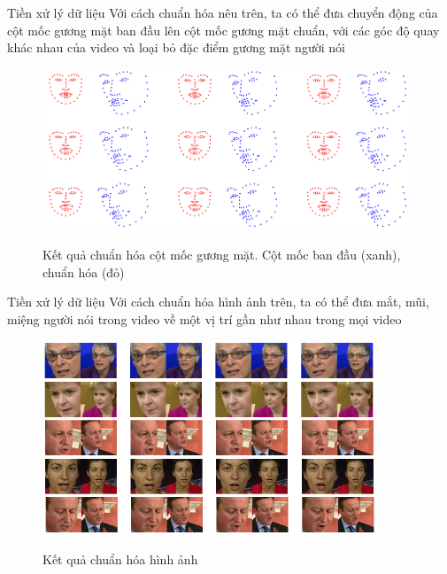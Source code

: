 \begin{frame}{Tiền xử lý dữ liệu}
    Với cách chuẩn hóa nêu trên, ta có thể đưa chuyển động của cột mốc gương mặt ban đầu lên cột mốc gương mặt chuẩn, với các góc độ quay khác nhau của video và loại bỏ đặc điểm gương mặt người nói
    \begin{figure}[H]
        \centering
        \includegraphics[width=11cm]{images/standardize_landmark.png}
        \label{fig:standardize_landmark}
        \caption{Kết quả chuẩn hóa cột mốc gương mặt. Cột mốc ban đầu (xanh), chuẩn hóa (đỏ)}
    \end{figure}
\end{frame}

\begin{frame}{Tiền xử lý dữ liệu}
    Với cách chuẩn hóa hình ảnh trên, ta có thể đưa mắt, mũi, miệng người nói trong video về một vị trí gần như nhau trong mọi video
    \begin{figure}[H]
        \centering
        \includegraphics[width=10cm]{images/preprocess-image.png}
        \label{fig:preprocess-image}
        \caption{Kết quả chuẩn hóa hình ảnh}
    \end{figure}
\end{frame}

